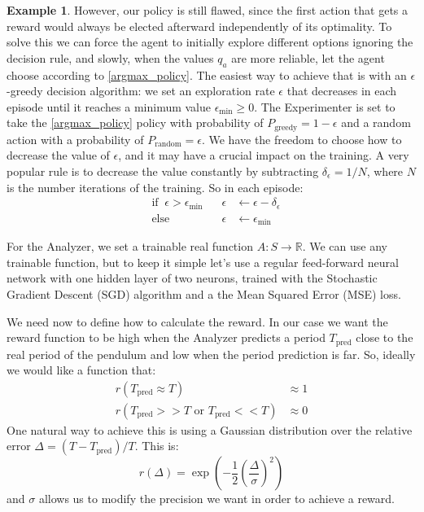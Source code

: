 \documentclass[11pt,a4paper,twoside]{report}
\newcommand{\+}{\textnormal{+} }
\theoremstyle{definition}
\newtheorem{myex}[mythm]{Example}
\numberwithin{equation}{chapter}
\begin{document}
\begin{myex}
However, our policy is still flawed, since the first action that gets a reward
would always be elected afterward independently of its optimality. To solve this
we can force the agent to initially explore different options ignoring the
decision rule, and slowly, when the values $q_a$ are more reliable, let the
agent choose according to \eqref{argmax_policy}. The easiest way to achieve that
is with an $\epsilon$-greedy decision algorithm: we set an exploration rate
$\epsilon$ that decreases in each episode until it reaches a minimum value
$\epsilon_\text{min}\geq 0$. The Experimenter is set to take the
\eqref{argmax_policy} policy with probability of $P_{\text{greedy}}=1-\epsilon$
and a random action with a probability of $P_{\text{random}}=\epsilon$. We have
the freedom to choose how to decrease the value of $\epsilon$, and it may have a
crucial impact on the training. A very popular rule is to decrease the value
constantly by subtracting $\delta_\epsilon = 1/N$, where $N$ is the number
iterations of the training. So in each episode:
\begin{align}
  &\text{if}\; \; \epsilon > \epsilon_\text{min} \;\;\;
  &\epsilon&\leftarrow\epsilon - \delta_\epsilon \\
  &\text{else} \; \;  &\epsilon &\leftarrow \epsilon_\text{min}
\end{align} 


For the Analyzer, we set a trainable real function $A: S \rightarrow
\mathbb{R}$. We can use any trainable function, but to keep it simple let's use
a regular feed-forward neural network with one hidden layer of two neurons,
trained with the Stochastic Gradient Descent (SGD) algorithm and a the Mean
Squared Error (MSE) loss.

We need now to define how to calculate the reward.  In our case we want the
reward function to be high when the Analyzer predicts a period $T_\text{pred}$
close to the real period of the pendulum and low when the period prediction is
far. So, ideally we would like a function that:
\begin{align}
       r(T_{\text{pred}} \approx T) &\approx 1\\
       r(T_{\text{pred}}>> T \text{ or } T_{\text{pred}} << T) & \approx 0
\end{align}
One natural way to achieve this is using a Gaussian distribution over the
relative error $\Delta=(T-T_{\text{pred}})/T$. This is:
\begin{equation}
   r(\Delta)=\exp\left(-\frac{1}{2}\left( \frac{\Delta}{\sigma} \right) ^2\right)
\end{equation}
and $\sigma$ allows us to modify the precision we want in order to achieve a 
reward.


\end{myex}
\end{document}
